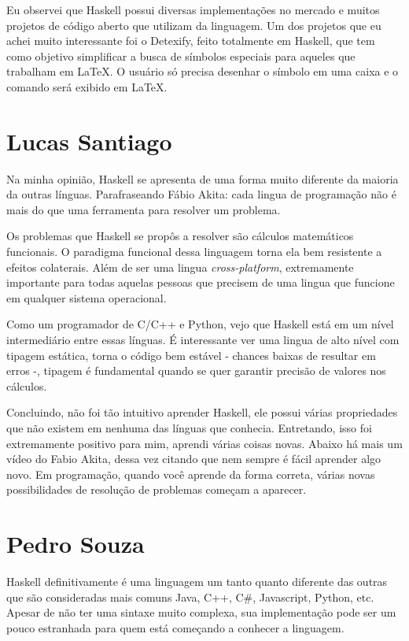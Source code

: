 \begin{apendicesenv}
    Eu observei que Haskell possui diversas implementações no mercado e muitos projetos de código aberto que utilizam da linguagem.
    Um dos projetos que eu achei muito interessante foi o Detexify, feito totalmente em Haskell, que tem como objetivo simplificar a 
    busca de símbolos especiais para aqueles que trabalham em \LaTeX. O usuário só precisa desenhar o símbolo em uma caixa e
    o comando será exibido em \LaTeX.
    
    \newpage 

    \chapter{Lucas Santiago}

    Na minha opinião, Haskell se apresenta de uma forma muito diferente da maioria da outras línguas. 
    Parafraseando Fábio Akita: cada lingua de programação não é mais do que uma ferramenta
    para resolver um problema.


    Os problemas que Haskell se propôs a resolver são cálculos matemáticos
    funcionais. O paradigma funcional dessa linguagem torna ela bem resistente a efeitos colaterais. Além de ser uma lingua
    \emph{cross-platform}, extremamente importante para todas aquelas pessoas que precisem de uma lingua que funcione
    em qualquer sistema operacional. 

    Como um programador de C/C++ e Python, vejo que Haskell está em um nível intermediário entre essas línguas.
    É interessante ver uma lingua de alto nível com tipagem estática, torna o código bem estável - chances baixas de 
    resultar em erros -, tipagem é fundamental quando se quer garantir precisão de valores nos cálculos.

    Concluindo, não foi tão intuitivo aprender Haskell, ele possui várias propriedades que não existem em nenhuma das línguas
    que conhecia. Entretando, isso foi extremamente positivo para mim, aprendi várias coisas novas. Abaixo há
    mais um vídeo do Fabio Akita, dessa vez citando que nem sempre é fácil aprender algo novo. Em programação,
    quando você aprende da forma correta, várias novas possibilidades de resolução de problemas começam a aparecer.

    \newpage

    \chapter{Pedro Souza}

    Haskell definitivamente é uma linguagem um tanto quanto diferente das outras que são consideradas mais comuns Java, C++, C\#, Javascript,
    Python, etc. Apesar de não ter uma sintaxe muito complexa, sua implementação pode ser um pouco estranhada para quem está começando a conhecer
    a linguagem. 


\end{apendicesenv}
